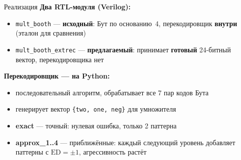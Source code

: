 \documentclass[aspectratio=169, 13pt]{beamer}
\begin{document}
\begin{frame}{Реализация}
  \textbf{Два RTL-модуля (Verilog):}
  \begin{itemize}
    \item \texttt{mult\_booth} — \textbf{исходный}: Бут по основанию~4,
          перекодировщик \textbf{внутри} (эталон для сравнения)
    \item \texttt{mult\_booth\_extrec} — \textbf{предлагаемый}: принимает
          \textbf{готовый} 24-битный вектор, перекодировщика нет
  \end{itemize}
  \vskip 10pt
  \textbf{Перекодировщик — на Python:}
  \begin{itemize}
    \item последовательный алгоритм, обрабатывает все 7 пар кодов Бута
    \item генерирует вектор \texttt{\{two, one, neg\}} для умножителя
    \item \textbf{exact} — точный: нулевая ошибка, только 2 паттерна
    \item \textbf{approx\_1..4} — приближённые: каждый следующий уровень
          добавляет паттерны с $\mathrm{ED}{=}\pm1$, агрессивность растёт
  \end{itemize}
\end{frame}
\end{document}
